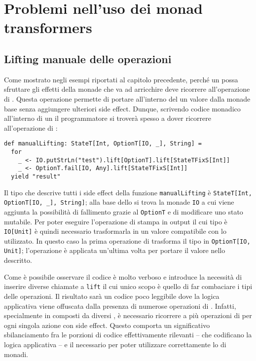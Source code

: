 \section{Problemi nell'uso dei monad transformers}
\subsection{Lifting manuale delle operazioni}
Come mostrato negli esempi riportati al capitolo precedente, perché un  possa sfruttare gli effetti della monade che va ad arricchire deve ricorrere all'operazione di . Questa operazione permette di portare all'interno del  un valore dalla monade base senza aggiungere ulteriori side effect.
Dunque, scrivendo codice monadico all'interno di un  il programmatore si troverà spesso a dover ricorrere all'operazione di :
\begin{lstlisting}[language=scala3]
def manualLifting: StateT[Int, OptionT[IO, _], String] =
  for
    _ <- IO.putStrLn("test").lift[OptionT].lift[StateTFixS[Int]]
    _ <- OptionT.fail[IO, Any].lift[StateTFixS[Int]]
  yield "result"
\end{lstlisting}
Il tipo che descrive tutti i side effect della funzione \lstinline{manualLifting} è \lstinline{StateT[Int, OptionT[IO, _], String]}; alla base dello  si trova la monade \lstinline{IO} a cui viene aggiunta la possibilità di fallimento grazie al  \lstinline{OptionT} e di modificare uno stato mutabile.
Per poter eseguire l'operazione di stampa in output il cui tipo è \lstinline{IO[Unit]} è quindi necessario trasformarla in un valore compatibile con lo  utilizzato. In questo caso la prima operazione di  trasforma il tipo in \lstinline{OptionT[IO, Unit]}; l'operazione è applicata un'ultima volta per portare il valore nello  descritto.

Come è possibile osservare il codice è molto verboso e introduce la necessità di inserire diverse chiamate a \lstinline{lift} il cui unico scopo è quello di far combaciare i tipi delle operazioni.
Il risultato sarà un codice poco leggibile dove la logica applicativa viene offuscata dalla presenza di numerose operazioni di .
Infatti, specialmente in  composti da diversi , è necessario ricorrere a più operazioni di  per ogni singola azione con side effect. Questo comporta un significativo sbilanciamento fra le porzioni di codice effettivamente rilevanti -- che codificano la logica applicativa -- e il  necessario per poter utilizzare correttamente lo  di monadi.

